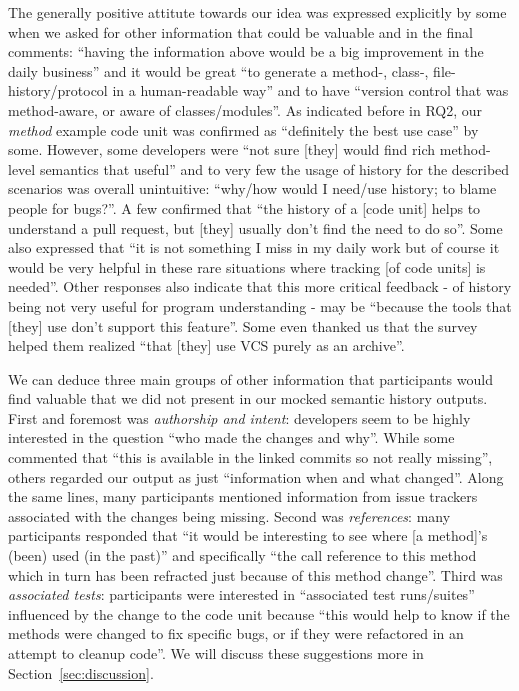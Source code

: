 
The generally positive attitute towards our idea was expressed explicitly by some when we asked for other information that could be valuable and in the final comments: ``having the information above would be a big improvement in the daily business'' and it would be great ``to generate a method-, class-, file-history/protocol in a human-readable way'' and to have ``version control that was method-aware, or aware of classes/modules''. As indicated before in RQ2, our \textit{method} example code unit was confirmed as ``definitely the best use case'' by some. However, some developers were ``not sure [they] would find rich method-level semantics that useful'' and to very few the usage of history for the described scenarios was overall unintuitive: ``why/how would I need/use history; to blame people for bugs?''. A few confirmed that ``the history of a [code unit] helps to understand a pull request, but [they] usually don't find the need to do so''. Some also expressed that ``it is not something I miss in my daily work but of course it would be very helpful in these rare situations where tracking [of code units] is needed''. Other responses also indicate that this more critical feedback - of history being not very useful for program understanding - may be ``because the tools that [they] use don't support this feature''. Some even thanked us that the survey helped them realized ``that [they] use VCS purely as an archive''.

We can deduce three main groups of other information that participants would find valuable that we did not present in our mocked semantic history outputs. First and foremost was \textit{authorship and intent}: developers seem to be highly interested in the question ``who made the changes and why''. While some commented that ``this is available in the linked commits so not really missing'', others regarded our output as just ``information when and what changed''. Along the same lines, many participants mentioned information from issue trackers associated with the changes being missing. Second was \textit{references}: many participants responded that ``it would be interesting to see where [a method]'s (been) used (in the past)'' and specifically ``the call reference to this method which in turn has been refracted just because of this method change''. Third was \textit{associated tests}: participants were interested in ``associated test runs/suites'' influenced by the change to the code unit because ``this would help to know if the methods were changed to fix specific bugs, or if they were refactored in an attempt to cleanup code''. We will discuss these suggestions more in Section~\ref{sec:discussion}.


